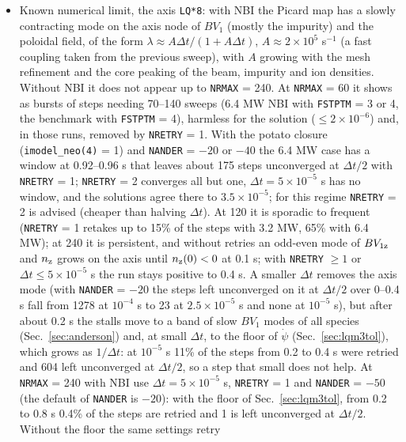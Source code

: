 \documentclass[11pt]{article}
\def\r#1{{\rm#1}}
\def\psid{\dot{\psi}}
\begin{document}
\begin{itemize}
  (Sec.~\ref{sec:lqm3tol}).  No input; a run in which no step reaches the floor is bit-identical.
\item Known numerical limit, the axis \texttt{LQ*8}: with NBI the Picard map has a slowly contracting
  mode on the axis node of $BV_1$ (mostly the impurity) and the poloidal field, of the form
  $\lambda \approx A\Delta t/(1 + A\Delta t)$, $A \approx 2\times10^5$ s$^{-1}$ (a fast coupling taken
  from the previous sweep), with $A$ growing with the mesh refinement and the core peaking of the
  beam, impurity and ion densities.  Without NBI it does not appear up to \texttt{NRMAX} = 240.
  At \texttt{NRMAX} = 60 it shows as bursts of steps needing 70--140 sweeps (6.4 MW NBI with
  \texttt{FSTPTM} = 3 or 4, the benchmark with \texttt{FSTPTM} = 4), harmless for the solution
  ($\le 2\times10^{-6}$) and, in those runs, removed by \texttt{NRETRY} = 1.  With the potato closure
  (\texttt{imodel\_neo(4)} = 1) and \texttt{NANDER} = $-20$ or $-40$ the 6.4 MW case has a window at
  0.92--0.96 s that leaves about 175 steps unconverged at $\Delta t/2$ with \texttt{NRETRY} = 1;
  \texttt{NRETRY} = 2 converges all but one, $\Delta t = 5\times10^{-5}$ s has no window, and the
  solutions agree there to $3.5\times10^{-5}$; for this regime \texttt{NRETRY} = 2 is advised (cheaper
  than halving $\Delta t$).  At 120 it is sporadic to frequent
  (\texttt{NRETRY} = 1 retakes up to 15\% of the steps with 3.2 MW, 65\% with 6.4 MW); at 240 it
  is persistent, and without retries an odd-even mode of $BV_{1\r{z}}$ and $n_\r{z}$ grows on the
  axis until $n_\r{z}(0) < 0$ at 0.1 s; with \texttt{NRETRY} $\ge 1$ or $\Delta t \le 5\times10^{-5}$ s the
  run stays positive to 0.4 s.  A smaller $\Delta t$ removes the axis mode (with \texttt{NANDER} =
  $-20$ the steps left unconverged on it at $\Delta t/2$ over 0--0.4 s fall from 1278 at $10^{-4}$ s to
  23 at $2.5\times10^{-5}$ s and none at $10^{-5}$ s), but after about 0.2 s the stalls move to a band
  of slow $BV_1$ modes of all species (Sec.~\ref{sec:anderson}) and, at small $\Delta t$, to the
  floor of $\psid$ (Sec.~\ref{sec:lqm3tol}), which grows as $1/\Delta t$: at $10^{-5}$ s 11\% of
  the steps from 0.2 to 0.4 s were retried and 604 left unconverged at $\Delta t/2$, so a step
  that small does not help.  At \texttt{NRMAX} = 240 with NBI use $\Delta t = 5\times10^{-5}$ s,
  \texttt{NRETRY} = 1 and \texttt{NANDER} = $-50$ (the default of \texttt{NANDER} is $-20$): with the floor
  of Sec.~\ref{sec:lqm3tol}, from 0.2 to 0.8 s 0.4\% of the steps are retried and 1 is left
  unconverged at $\Delta t/2$.  Without the floor the same settings retry

\end{itemize}
\end{document}
